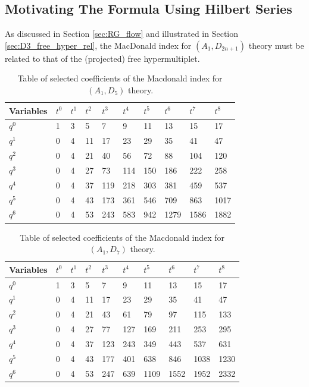 \documentclass[a4paper,10pt]{article}
\begin{document}
\subsection{Motivating The Formula Using Hilbert Series}
As discussed in Section \ref{sec:RG_flow} and illustrated in Section \ref{sec:D3_free_hyper_rel}, the MacDonald index for $(A_1,D_{2n+1})$ theory must be related to that of the (projected) free hypermultiplet. %
\begin{table}[]
    \centering
    \begin{tabular}{|l|lllllllll|}
\hline Variables & $t^0$ & $t^1$ & $t^2$ & $t^3$ & $t^4$ & $t^5$ & $t^6$ & $t^7$ & $t^8$ \\
\hline
$q^0$ & 1 & 3 & 5 & 7 & 9 & 11 & 13 & 15 & 17 \\
$q^1$ & 0 & 4 & 11 & 17 & 23 & 29 & 35 & 41 & 47 \\
$q^2$ & 0 & 4 & 21 & 40 & 56 & 72 & 88 & 104 & 120 \\
$q^3$ & 0 & 4 & 27 & 73 & 114 & 150 & 186 & 222 & 258 \\
$q^4$ & 0 & 4 & 37 & 119 & 218 & 303 & 381 & 459 & 537 \\
$q^5$ & 0 & 4 & 43 & 173 & 361 & 546 & 709 & 863 & 1017 \\
$q^6$ & 0 & 4 & 53 & 243 & 583 & 942 & 1279 & 1586 & 1882 \\
\hline
\end{tabular}
    \caption{Table of selected coefficients of the Macdonald index for $(A_1,D_5)$ theory.}
    \label{tab:coeff_mac_A1D5}
\end{table}
\begin{table}[]
    \centering
    \begin{tabular}{|l|lllllllll|}
\hline Variables & $t^0$ & $t^1$ & $t^2$ & $t^3$ & $t^4$ & $t^5$ & $t^6$ & $t^7$ & $t^8$ \\
\hline $q^0$ & 1 & 3 & 5 & 7 & 9 & 11 & 13 & 15 & 17 \\
$q^1$ & 0 & 4 & 11 & 17 & 23 & 29 & 35 & 41 & 47 \\
$q^2$ & 0 & 4 & 21 & 43 & 61 & 79 & 97 & 115 & 133 \\
$q^3$ & 0 & 4 & 27 & 77 & 127 & 169 & 211 & 253 & 295 \\
$q^4$ & 0 & 4 & 37 & 123 & 243 & 349 & 443 & 537 & 631 \\
$q^5$ & 0 & 4 & 43 & 177 & 401 & 638 & 846 & 1038 & 1230 \\
$q^6$ & 0 & 4 & 53 & 247 & 639 & 1109 & 1552 & 1952 & 2332 \\
\hline
\end{tabular}
    \caption{Table of selected coefficients of the Macdonald index for $(A_1,D_7)$ theory.}
    \label{tab:coeff_mac_A1D7}
\end{table}
\end{document}
